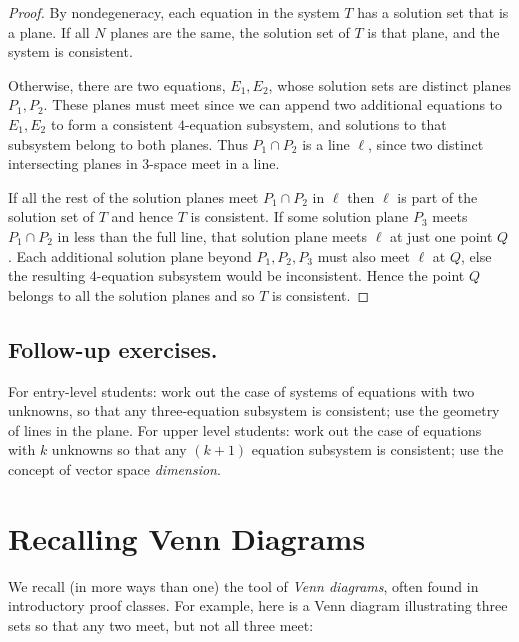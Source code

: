 \documentclass[11pt]
{amsart}
\begin{document}
\begin{proof}By nondegeneracy, each equation in the system $T$ has a solution set that is a plane. If all $N$ planes are the same, the solution set of $T$ is that plane, and the system is consistent. 

Otherwise, there are two equations, $E_1,E_2$, whose solution sets are distinct planes $P_1,P_2$. These planes must meet since we can append two additional equations to $E_1,E_2$ to form a consistent $4$-equation subsystem, and solutions to that subsystem belong to both planes. Thus $P_1 \cap P_2$ is a line $\ell$, since two distinct intersecting planes in $3$-space meet in a line.

If all the rest of the solution planes meet $P_1 \cap P_2$  in $\ell$ then $\ell$ is part of the solution set of $T$ and hence $T$ is consistent.  If some solution plane $P_3$ meets $P_1 \cap P_2$ in less than the full line, that solution plane meets $\ell$ at just one point $Q$. Each additional solution plane beyond $P_1,P_2,P_3$  must also meet $\ell$ at $Q$, else the resulting $4$-equation subsystem would be inconsistent. Hence the point $Q$ belongs to all the solution planes and so $T$ is consistent.
\end{proof}

\subsection{Follow-up exercises.} For entry-level students: work out the case of systems of equations with two unknowns, so that any three-equation subsystem is consistent;  use the geometry of lines in the plane. For upper level students: work out the case of equations with $k$ unknowns so that any  $(k+1)$ equation subsystem is consistent; use the concept of vector space \emph{dimension}.

\section{Recalling Venn Diagrams}

We recall (in more ways than one) the tool of \emph{Venn diagrams}, often found in introductory proof classes. For example, here is a Venn diagram illustrating three sets so that any two meet, but not all three meet:


\def\firstcircle{(-0.6,-0.6) circle (1.5cm)}
\def\secondcircle{(60:2cm) circle (1.5cm)}
\def\thirdcircle{(-17:2.2cm) circle (1.4cm)}
\smallskip {}
\end{document}
